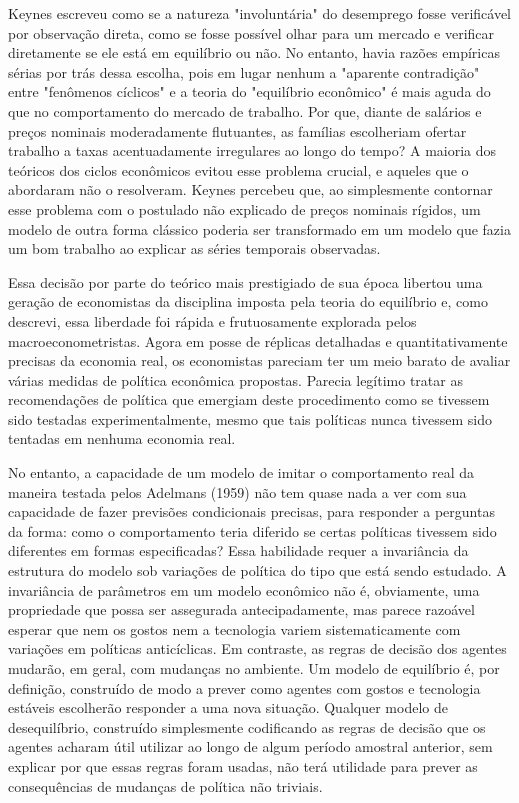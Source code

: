 \documentclass[12pt]{article}
\begin{document}
Keynes escreveu como se a natureza "involuntária" do desemprego fosse verificável por observação direta, como se fosse possível olhar para um mercado e verificar diretamente se ele está em equilíbrio ou não. No entanto, havia razões empíricas sérias por trás dessa escolha, pois em lugar nenhum a "aparente contradição" entre "fenômenos cíclicos" e a teoria do "equilíbrio econômico" é mais aguda do que no comportamento do mercado de trabalho. Por que, diante de salários e preços nominais moderadamente flutuantes, as famílias escolheriam ofertar trabalho a taxas acentuadamente irregulares ao longo do tempo? A maioria dos teóricos dos ciclos econômicos evitou esse problema crucial, e aqueles que o abordaram não o resolveram. Keynes percebeu que, ao simplesmente contornar esse problema com o postulado não explicado de preços nominais rígidos, um modelo de outra forma clássico poderia ser transformado em um modelo que fazia um bom trabalho ao explicar as séries temporais observadas.

Essa decisão por parte do teórico mais prestigiado de sua época libertou uma geração de economistas da disciplina imposta pela teoria do equilíbrio e, como descrevi, essa liberdade foi rápida e frutuosamente explorada pelos macroeconometristas. Agora em posse de réplicas detalhadas e quantitativamente precisas da economia real, os economistas pareciam ter um meio barato de avaliar várias medidas de política econômica propostas. Parecia legítimo tratar as recomendações de política que emergiam deste procedimento como se tivessem sido testadas experimentalmente, mesmo que tais políticas nunca tivessem sido tentadas em nenhuma economia real.

No entanto, a capacidade de um modelo de imitar o comportamento real da maneira testada pelos Adelmans (1959) não tem quase nada a ver com sua capacidade de fazer previsões condicionais precisas, para responder a perguntas da forma: como o comportamento teria diferido se certas políticas tivessem sido diferentes em formas especificadas? Essa habilidade requer a invariância da estrutura do modelo sob variações de política do tipo que está sendo estudado. A invariância de parâmetros em um modelo econômico não é, obviamente, uma propriedade que possa ser assegurada antecipadamente, mas parece razoável esperar que nem os gostos nem a tecnologia variem sistematicamente com variações em políticas anticíclicas. Em contraste, as regras de decisão dos agentes mudarão, em geral, com mudanças no ambiente. Um modelo de equilíbrio é, por definição, construído de modo a prever como agentes com gostos e tecnologia estáveis escolherão responder a uma nova situação. Qualquer modelo de desequilíbrio, construído simplesmente codificando as regras de decisão que os agentes acharam útil utilizar ao longo de algum período amostral anterior, sem explicar por que essas regras foram usadas, não terá utilidade para prever as consequências de mudanças de política não triviais.
\end{document}
